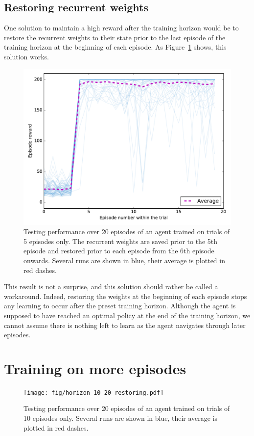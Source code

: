 \subsection{Restoring recurrent weights}
One solution to maintain a high reward after the training horizon would be 
to restore the recurrent weights to their state prior to the last episode of 
the training horizon at the beginning of each episode. As 
Figure~\ref{fig:horizon_5_20_restoring} shows, this solution works.\\

\begin{figure}
	\centering
	\includegraphics[width=0.8\linewidth]{fig/horizon_5_20_restoring.pdf}
	\caption{Testing performance over 20 episodes of an agent trained on 
	trials of 5 episodes only. The recurrent weights are saved prior to 
	the 5th episode and restored prior to each episode from the 6th episode
	onwards. Several runs are shown in blue, their average is plotted in
	red dashes.}
	\label{fig:horizon_5_20_restoring}
\end{figure}

This result is not a surprise, and this solution should rather be called a 
workaround. Indeed, restoring the weights at the beginning of each episode
stops any learning to occur after the preset training horizon. Although the
agent is supposed to have reached an optimal policy at the end of the training
horizon, we cannot assume there is nothing left to learn as the agent navigates
through later episodes.

\section{Training on more episodes}

\begin{figure}
	\centering
	\texttt{[image: fig/horizon\_10\_20\_restoring.pdf]}
	\caption{Testing performance over 20 episodes of an agent trained on 
	trials of 10 episodes only. 
	Several runs are shown in blue, their average is plotted in red dashes.}
	\label{fig:horizon_10_20}
\end{figure}
